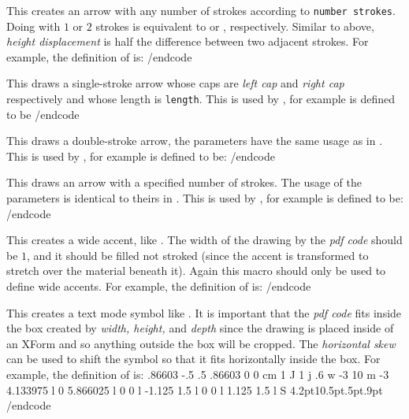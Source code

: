  This creates an arrow
with any number of strokes according to {\tt number strokes}.
Doing \macroname\@multi@Arrow@def{} with $1$ or $2$ strokes is equivalent to \macroname\@arrow@def{} or \macroname\@Arrow@def{},
respectively.
Similar to above, {\it height displacement} is half the difference between two adjacent strokes.
For example, the definition of \macroname\varRrightarrow{} is:
\begincode
{}\@TripleLinecap{}
/endcode
\emacroexp

 This draws a single-stroke arrow whose caps are {\it left cap} and
{\it right cap} respectively and whose length is {\tt length}.
This is used by \macroname\@arrow@def{}, for example \macroname\varrightarrow{} is defined to be
\begincode
\@arrow@type\@linecap\@rarrow{\arrow@len}
/endcode
\emacroexp

 This draws a double-stroke arrow, the parameters
have the same usage as in \macroname\@Arrow@def.
This is used by \macroname\@Arrow@def, for example \macroname\varRightarrow{} is defined to be:
\begincode
\@Arrow@type\@Linecap{}
/endcode
\emacroexp

 This draws an  arrow with a
specified number of strokes.
The usage of the parameters is identical to theirs in\hfill{} \macroname\@multi@Arrow@def.
This is used by \macroname\@multi@Arrow@def, for example \macroname\varRrightarrow{} is defined to be:
\begincode
{}\@TripleLinecap{}
/endcode
\emacroexp

 This creates a wide accent, like \macroname\varwidecheck.
The width of the drawing by the {\it pdf code} should be $1$, and it should be filled not stroked (since the accent is
transformed to stretch over the material beneath it).
Again this macro should only be used to define wide accents.
For example, the definition of \macroname\varwidecheck{} is:
\begincode
\def\varwidecheck{\@wide@accent{0 1.3 m .5 -.4 l 1 1.3 l 1 1.6 l .5 .3 l 0 1.6 l f}}
/endcode
\emacroexp

 This creates a text mode
symbol like \macroname\lightning.
It is important that the {\it pdf code} fits inside the box created by {\it width, height,\/} and {\it depth} since the
drawing is placed inside of an XForm and so anything outside the box will be cropped.
The {\it horizontal skew} can be used to shift the symbol so that it fits horizontally inside the box.
For example, the definition of \macroname\lightning{} is:
\begincode
{}       %
    {.86603 -.5 .5 .86603 0 0 cm    %
    1 J 1 j .6 w
    -3 10 m -3 4.133975 l 0 5.866025 l 0 0 l -1.125 1.5 l 0 0 l 1.125 1.5 l S}
    {4.2pt}{10.5pt}{.5pt}{.9pt}
/endcode
\emacroexp

